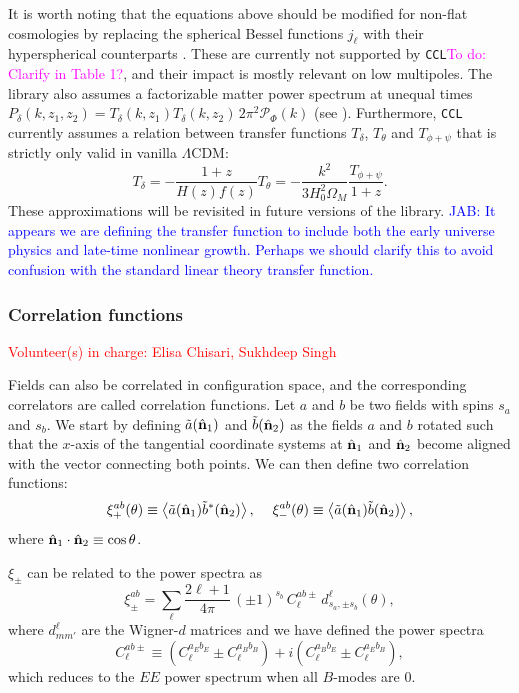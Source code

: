 \documentclass[\docopts]{\docclass}
\newcommand{\nv}{\hat{\bf n}}
\newcommand{\todo}[1]{\textcolor{magenta}{To do: #1}}
\newcommand{\vol}[1]{\textcolor{red}{Volunteer(s) in charge: #1}}
\newcommand{\jab}[1]{\textcolor{blue}{JAB: #1}}
\newcommand{\ccl}{{\tt CCL}\xspace}
\begin{document}
\noindent
It is worth noting that the equations above should be modified for non-flat cosmologies by replacing the spherical Bessel functions $j_\ell$ with their hyperspherical counterparts \citep{1994ApJ...432....7K}. These are currently not supported by \ccl \todo{Clarify in Table 1?}, and their impact is mostly relevant on low multipoles. The library also assumes a factorizable matter power spectrum at unequal times $P_\delta(k,z_1,z_2)=T_\delta(k,z_1)T_\delta(k,z_2)\,2\pi^2\mathcal{P}_\Phi(k)$ (see \citealt{2017PhRvD..95f3522K}). Furthermore, \ccl currently assumes a relation between transfer functions $T_\delta$, $T_\theta$ and $T_{\phi+\psi}$ that is strictly only valid in vanilla $\Lambda$CDM:
\begin{equation}
  T_\delta=-\frac{1+z}{H(z)f(z)}T_\theta=-\frac{k^2}{3H_0^2\Omega_M}\frac{T_{\phi+\psi}}{1+z}.
\end{equation}
These approximations will be revisited in future versions of the library. \jab{It appears we are defining the transfer function to include both the early universe physics and late-time nonlinear growth. Perhaps we should clarify this to avoid confusion with the standard linear theory transfer function.}


\subsubsection{Correlation functions}
\vol{Elisa Chisari, Sukhdeep Singh}


Fields can also be correlated in configuration space, and the corresponding correlators are called correlation functions. Let $a$ and $b$ be two fields with spins $s_a$ and $s_b$. We start by defining $\tilde{a}(\nv_1)$ and $\tilde{b}(\nv_2)$ as the fields $a$ and $b$ rotated such that the $x$-axis of the tangential coordinate systems at $\nv_1$ and $\nv_2$ become aligned with the vector connecting both points. We can then define two correlation functions:
\begin{equation}\nonumber
  \xi^{ab}_+(\theta)\equiv\left\langle\tilde{a}(\nv_1)\tilde{b}^*(\nv_2)\right\rangle,\hspace{12pt}
  \xi^{ab}_-(\theta)\equiv\left\langle\tilde{a}(\nv_1)\tilde{b}(\nv_2)\right\rangle,
  \label{eq:xipm}
\end{equation}
where $\nv_1\cdot\nv_2\equiv\cos\theta$. 

$\xi_{\pm}$ can be related to the power spectra as
\begin{equation}\label{eq:cl_xi}
 \xi^{ab}_\pm = \sum_\ell\frac{2\ell+1}{4\pi}\,(\pm1)^{s_b}\,C^{ab\pm}_\ell\,d^\ell_{s_a,\pm s_b}(\theta),
\end{equation}
where $d^\ell_{mm'}$ are the Wigner-$d$ matrices \citep{Ng1999,2004MNRAS.350..914C} and we have defined the power spectra
\begin{equation}
  C^{ab\pm}_\ell\equiv\left(C^{a_Eb_E}_\ell\pm C^{a_Bb_B}_\ell\right)+i\left(C^{a_Bb_E}_\ell\pm C^{a_Eb_B}_\ell\right),
\end{equation}
which reduces to the $EE$ power spectrum when all $B$-modes are 0.
\end{document}

